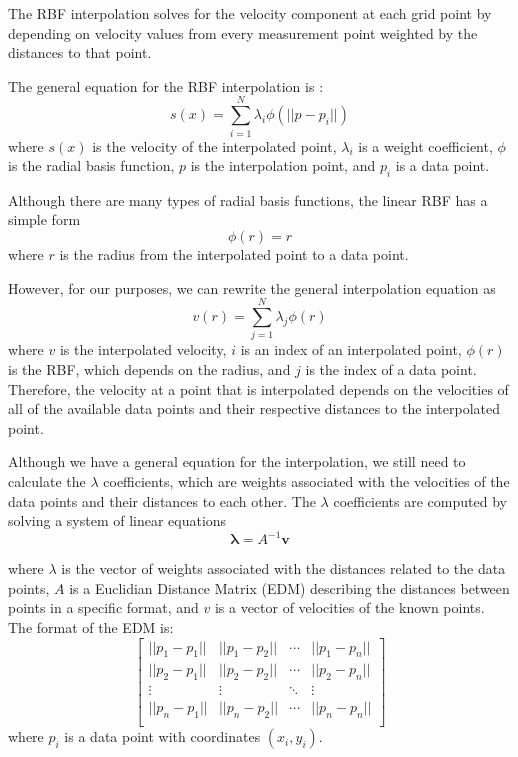 The RBF interpolation solves for the velocity component at each grid point by depending on velocity values from every measurement point weighted by the distances to that point.




The general equation for the RBF interpolation is \citep{buhmann2003radial}:
\begin{equation}s(x)=\sum\limits_{i=1}^N \lambda_i\phi(||p-p_i||)\end{equation}
where $s(x)$ is the velocity of the interpolated point, $\lambda_i$ is a weight coefficient, $\phi$ is the radial basis function, $p$ is the interpolation point, and $p_i$ is a data point.

Although there are many types of radial basis functions, the linear RBF has a simple form
\begin{equation}\phi(r)=r\end{equation}
where $r$ is the radius from the interpolated point to a data point.

However, for our purposes, we can rewrite the general interpolation equation as
\begin{equation}v(r)=\sum\limits_{j=1}^N\lambda_j\phi(r)\end{equation}
%
where $v$ is the interpolated velocity, $i$ is an index of an interpolated point, $\phi(r)$ is the RBF, which depends on the radius, and $j$ is the index of a data point. Therefore, the velocity at a point that is interpolated depends on the velocities of all of the available data points and their respective distances to the interpolated point.

Although we have a general equation for the interpolation, we still need to calculate the $\lambda$ coefficients, which are weights associated with the velocities of the data points and their distances to each other. The $\lambda$ coefficients are computed by solving a system of linear equations
\begin{equation}\mathbf{\lambda}=A^{-1}\mathbf{v}\end{equation}

where $\lambda$ is the vector of weights associated with the distances related to the data points, $A$ is a Euclidian Distance Matrix (EDM) describing the distances between points in a specific format, and $v$ is a vector of velocities of the known points. 
The format of the EDM is:
\begin{equation}\begin{bmatrix}
||p_1-p_1|| & ||p_1-p_2|| & \cdots & ||p_1-p_n||\\
||p_2-p_1|| & ||p_2-p_2|| & \cdots & ||p_2-p_n||\\
\vdots & \vdots & \ddots & \vdots \\
||p_n-p_1|| & ||p_n-p_2|| & \cdots & ||p_n-p_n||\\
\end{bmatrix}\end{equation}
where $p_i$ is a data point with coordinates $(x_i,y_i)$.

